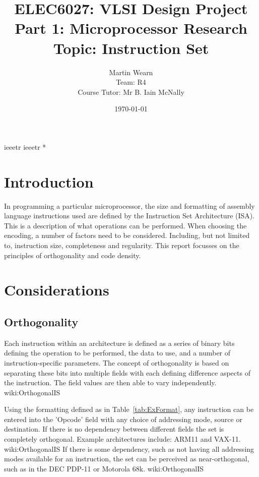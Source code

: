 \documentclass[12pt,a4paper]{article}
\title{ELEC6027: VLSI Design Project \\Part 1: Microprocessor Research\\Topic: Instruction Set}
\author{Martin Wearn\\ Team: R4\\Course Tutor: Mr B. Iain McNally}
\date{\today}
\begin{document}
{ieeetr}
{ieeetr}
\nocite{bibl}{*} %

\begin{titlepage}
\clearpage
\maketitle
\thispagestyle{empty}
\end{titlepage}

\tableofcontents
\clearpage

\section{Introduction}
In programming a particular microprocessor, the size and formatting of assembly language instructions used are defined by the Instruction Set Architecture (ISA). This is a description of what operations can be performed. When choosing the encoding, a number of factors need to be considered. Including, but not limited to, instruction size, completeness and regularity. This report focusses on the principles of orthogonality and code density. 

\section{Considerations}

\subsection{Orthogonality}
Each instruction within an architecture is defined as a series of binary bits defining the operation to be performed, the data to use, and a number of instruction-specific parameters. The concept of orthogonality is based on separating these bits into multiple fields with each defining difference aspects of the instruction. The field values are then able to vary independently. \cite{ref}{wiki:OrthogonalIS}

Using the formatting defined as in Table~\ref{tab:ExFormat}, any instruction can be entered into the 'Opcode' field with any choice of addressing mode, source or destination. If there is no dependency between different fields the set is completely orthogonal. Example architectures include: ARM11 and VAX-11. \cite{ref}{wiki:OrthogonalIS}
If there is some dependency, such as not having all addressing modes available for an instruction, the set can be perceived as near-orthogonal, such as in the DEC PDP-11 or Motorola 68k. \cite{ref}{wiki:OrthogonalIS}
\end{document}
